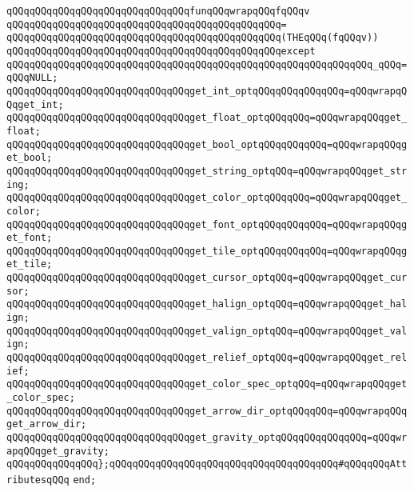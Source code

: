 \newline
\verb|qQQqqQQqqQQqqQQqqQQqqQQqqQQqqQQqfunqQQqwrapqQQqfqQQqv|\newline
\verb|qQQqqQQqqQQqqQQqqQQqqQQqqQQqqQQqqQQqqQQqqQQqqQQq=|\newline
\verb|qQQqqQQqqQQqqQQqqQQqqQQqqQQqqQQqqQQqqQQqqQQqqQQq(THEqQQq(fqQQqv))|\newline
\verb|qQQqqQQqqQQqqQQqqQQqqQQqqQQqqQQqqQQqqQQqqQQqqQQqexcept|\newline
\verb|qQQqqQQqqQQqqQQqqQQqqQQqqQQqqQQqqQQqqQQqqQQqqQQqqQQqqQQqqQQqqQQq_qQQq=qQQqNULL;|\newline
\newline
\verb|qQQqqQQqqQQqqQQqqQQqqQQqqQQqqQQqget_int_optqQQqqQQqqQQqqQQq=qQQqwrapqQQqget_int;|\newline
\verb|qQQqqQQqqQQqqQQqqQQqqQQqqQQqqQQqget_float_optqQQqqQQq=qQQqwrapqQQqget_float;|\newline
\verb|qQQqqQQqqQQqqQQqqQQqqQQqqQQqqQQqget_bool_optqQQqqQQqqQQq=qQQqwrapqQQqget_bool;|\newline
\verb|qQQqqQQqqQQqqQQqqQQqqQQqqQQqqQQqget_string_optqQQq=qQQqwrapqQQqget_string;|\newline
\verb|qQQqqQQqqQQqqQQqqQQqqQQqqQQqqQQqget_color_optqQQqqQQq=qQQqwrapqQQqget_color;|\newline
\verb|qQQqqQQqqQQqqQQqqQQqqQQqqQQqqQQqget_font_optqQQqqQQqqQQq=qQQqwrapqQQqget_font;|\newline
\verb|qQQqqQQqqQQqqQQqqQQqqQQqqQQqqQQqget_tile_optqQQqqQQqqQQq=qQQqwrapqQQqget_tile;|\newline
\verb|qQQqqQQqqQQqqQQqqQQqqQQqqQQqqQQqget_cursor_optqQQq=qQQqwrapqQQqget_cursor;|\newline
\verb|qQQqqQQqqQQqqQQqqQQqqQQqqQQqqQQqget_halign_optqQQq=qQQqwrapqQQqget_halign;|\newline
\verb|qQQqqQQqqQQqqQQqqQQqqQQqqQQqqQQqget_valign_optqQQq=qQQqwrapqQQqget_valign;|\newline
\verb|qQQqqQQqqQQqqQQqqQQqqQQqqQQqqQQqget_relief_optqQQq=qQQqwrapqQQqget_relief;|\newline
\newline
\verb|qQQqqQQqqQQqqQQqqQQqqQQqqQQqqQQqget_color_spec_optqQQq=qQQqwrapqQQqget_color_spec;|\newline
\verb|qQQqqQQqqQQqqQQqqQQqqQQqqQQqqQQqget_arrow_dir_optqQQqqQQq=qQQqwrapqQQqget_arrow_dir;|\newline
\verb|qQQqqQQqqQQqqQQqqQQqqQQqqQQqqQQqget_gravity_optqQQqqQQqqQQqqQQq=qQQqwrapqQQqget_gravity;|\newline
\newline
\verb|qQQqqQQqqQQqqQQq};qQQqqQQqqQQqqQQqqQQqqQQqqQQqqQQqqQQqqQQq#qQQqqQQqAttributesqQQq|\newline
\newline
\verb|end;|\newline
\newline


